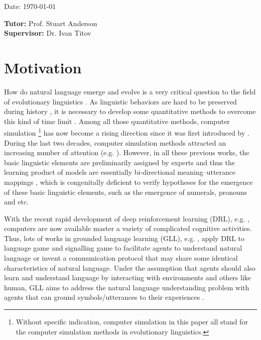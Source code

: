\documentclass[a4paper,11pt]{article}
\newcommand{\tutor}{Prof. Stuart Anderson}
\newcommand{\supervisor}{Dr. Ivan Titov}
\begin{document}
\vspace*{3cm}
Date: \today

\vfill
{\bf Tutor:} \tutor\\
{\bf Supervisor:} \supervisor
\newpage

\setcounter{page}{1}                            %
\footruleheight{1pt}
\headruleheight{1pt}
\rhead{- \thepage}
\cfoot{}
%
\tableofcontents

\section{Motivation}
\label{sec:1intro}

How do natural language emerge and evolve is a very critical question to the field of evolutionary linguistics \cite{macwhinney2013emergence}. As linguistic behaviors are hard to be preserved during history \cite{lieberman2006toward}, it is necessary to develop some quantitative methods to overcome this kind of time limit \cite{evans2009myth}. Among all those quantitative methods, computer simulation \footnote{Without specific indication, computer simulation in this paper all stand for the computer simulation methods in evolutionary linguistics.} has now become a rising direction since it was first introduced by \cite{hurford1989biological}. During the last two decades, computer simulation methods attracted an increasing number of attention (e.g. \cite{hurford1998approaches, knight2000evolutionary, briscoe2002book, cangelosi2012simulating, christiansen2003language, bickerton2009biological}). However, in all these previous works, the basic linguistic elements are preliminarily assigned by experts and thus the learning product of models are essentially bi-directional meaning–utterance mappings \cite{gong2013computer}, which is congenitally deficient to verify hypotheses for the emergence of these basic linguistic elements, such as the emergence of numerals, pronouns and etc.

With the recent rapid development of deep reinforcement learning (DRL), e.g. \cite{mnih2015human, silver2017mastering}, computers are now available master a variety of complicated cognitive activities. Thus, lots of works in grounded language learning (GLL), e.g.  \cite{hermann2017grounded, havrylov2017emergence, mordatch2018emergence}, apply DRL to language game \cite{wittgenstein2009philosophical} and signalling game \cite{lewis2008convention} to facilitate agents to understand natural language or invent a communication protocol that may share some identical characteristics of natural language. Under the assumption that agents should also learn and understand language by interacting with environments and others like human, GLL aims to address the natural language understanding problem with agents that can ground symbols/utterances to their experiences \cite{hill2017understanding}.
\end{document}
